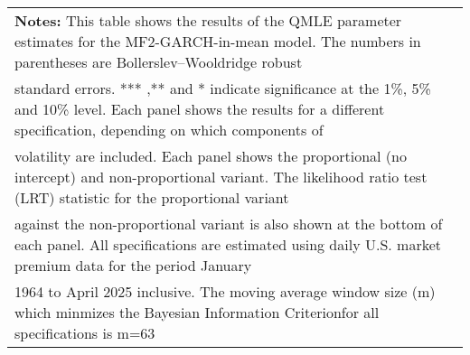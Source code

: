 \documentclass{article}
\begin{document}
\begin{table}[t]
\begin{tabular}{ccccccccccccccccc}
\midrule
\multicolumn{17}{l}{\textbf{Notes:} This table shows the results of the QMLE parameter estimates for the MF2-GARCH-in-mean model. The numbers in parentheses are Bollerslev–Wooldridge robust}\\
\multicolumn{17}{l}{standard errors. *** ,** and * indicate significance at the 1\%, 5\% and 10\% level. Each panel shows the results for a different specification, depending on which components of}\\
\multicolumn{17}{l}{volatility are included. Each panel shows the proportional (no intercept) and non-proportional variant. The likelihood ratio test (LRT) statistic for the proportional variant}\\
\multicolumn{17}{l}{against the non-proportional variant is also shown at the bottom of each panel. All specifications are estimated using daily U.S. market premium data for the period January}\\
\multicolumn{17}{l}{1964 to April 2025 inclusive. The moving average window size (m) which minmizes the Bayesian Information Criterionfor all specifications is m=63}\\
\midrule
\midrule
\end{tabular}
\end{table}
\end{document}

